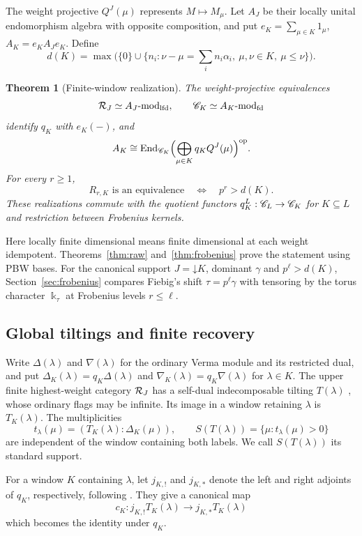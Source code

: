 \documentclass[11pt,reqno]{amsart}
\newcommand{\kk}{\Bbbk}\newcommand{\ZZ}{\mathbb Z}\newcommand{\NN}{\mathbb N}
\newtheorem{theorem}{Theorem}[section]
\theoremstyle{definition}
\theoremstyle{remark}
\numberwithin{equation}{section}
\begin{document}
The weight projective $Q^J(\mu)$ represents $M\mapsto M_\mu$.
Let $A_J$ be their locally unital endomorphism algebra with opposite
composition, and put
$e_K=\sum_{\mu\in K}1_\mu$, $A_K=e_KA_Je_K$. Define
\[
 d(K)=\max\bigl(\{0\}\cup
 \{n_i:\nu-\mu=\textstyle\sum_i n_i\alpha_i,\ 
                         \mu,\nu\in K,\ \mu\leq\nu\}\bigr).
\]

\begin{theorem}[Finite-window realization]\label{thm:intro-window}
The weight-projective equivalences
\[
 \mathcal R_J\simeq A_J\text{-}\mathrm{mod}_{\mathrm{lfd}},
 \qquad \mathscr C_K\simeq A_K\text{-}\mathrm{mod}_{\mathrm{fd}}
\]
identify $q_K$ with $e_K(-)$, and
\[
 A_K\cong
 \operatorname{End}_{\mathscr C_K}\Bigl(\bigoplus_{\mu\in K}q_KQ^J(\mu)\Bigr)^{\mathrm{op}}.
\]
For every $r\geq1$,
\[
 R_{r,K}\text{ is an equivalence}
 \quad\Longleftrightarrow\quad p^r>d(K).
\]
These realizations commute with the quotient functors
$q_K^L:\mathscr C_L\to\mathscr C_K$ for $K\subseteq L$ and restriction
between Frobenius kernels.
\end{theorem}

Here locally finite dimensional means finite dimensional at each weight
idempotent. Theorems~\ref{thm:raw} and~\ref{thm:frobenius} prove the
statement using PBW bases. For the canonical support
$J=\mathord\downarrow K$, dominant $\gamma$ and $p^\ell>d(K)$,
Section~\ref{sec:frobenius} compares Fiebig's shift
$\tau=p^\ell\gamma$ with tensoring by the torus character $\kk_\tau$
at Frobenius levels $r\leq\ell$.

\subsection{Global tiltings and finite recovery}
Write $\Delta(\lambda)$ and $\nabla(\lambda)$ for the ordinary Verma
module and its restricted dual, and put
$\Delta_K(\lambda)=q_K\Delta(\lambda)$ and
$\nabla_K(\lambda)=q_K\nabla(\lambda)$ for $\lambda\in K$.
The upper finite highest-weight
category $\mathcal R_J$ has a self-dual indecomposable tilting
$T(\lambda)$ \cite[Theorem~4.18]{BS}, whose ordinary flags may
be infinite. Its image in a window retaining $\lambda$ is
$T_K(\lambda)$. The multiplicities
\[
 t_\lambda(\mu)=(T_K(\lambda):\Delta_K(\mu)),\qquad
 S(T(\lambda))=\{\mu:t_\lambda(\mu)>0\}
\]
are independent of the window containing both labels. We call
$S(T(\lambda))$ its standard support.

For a window $K$ containing $\lambda$, let $j_{K,!}$ and $j_{K,*}$
denote the left and right adjoints of $q_K$, respectively, following
\cite[Section~2.5]{BS}. They give a canonical map
\[
 c_K:j_{K,!}T_K(\lambda)\longrightarrow j_{K,*}T_K(\lambda)
\]
which becomes the identity under $q_K$.
\end{document}

